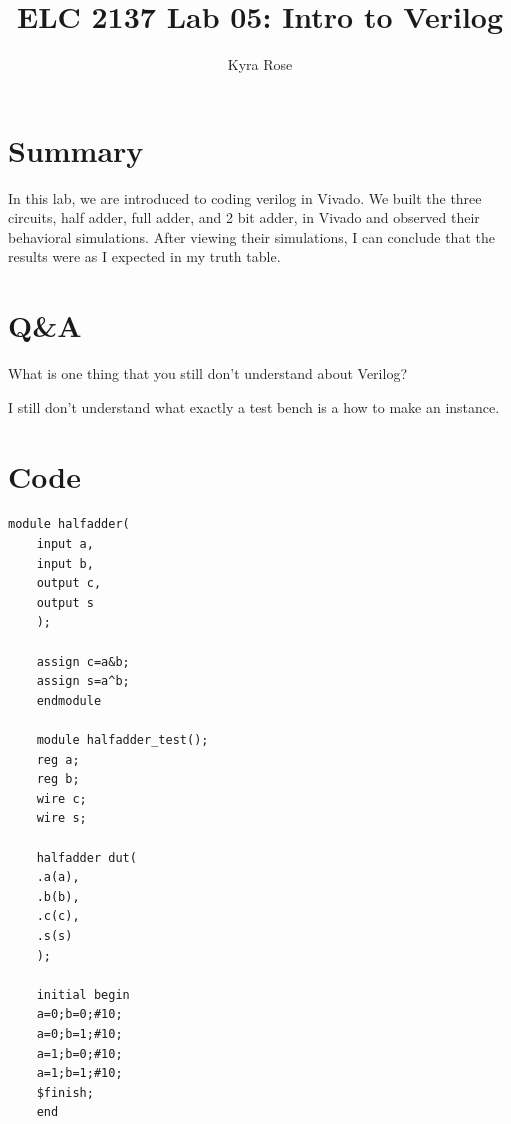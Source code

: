 \documentclass[11pt]{article}
\begin{document}
\title{ELC 2137 Lab 05: Intro to Verilog}
\author{Kyra Rose}

\maketitle


\section*{Summary}

In this lab, we are introduced to coding verilog in Vivado. We built the three circuits, half adder, full adder, and 2 bit adder, in Vivado and observed their behavioral simulations. After viewing their simulations, I can conclude that the results were as I expected in my truth table. 


\section*{Q\&A}

What is one thing that you still don't understand about Verilog?

I still don't understand what exactly a test bench is a how to make an instance. 

\section*{Code}

\begin{lstlisting}[style=Verilog,
	caption=Half Adder code,
	label=code:ex 
	]
	module halfadder(
	input a,
	input b,
	output c,
	output s
	);
	
	assign c=a&b;
	assign s=a^b;
	endmodule
	
	module halfadder_test();
	reg a;
	reg b;
	wire c;
	wire s;
	
	halfadder dut(
	.a(a),
	.b(b),
	.c(c),
	.s(s)
	);
	
	initial begin
	a=0;b=0;#10;
	a=0;b=1;#10;
	a=1;b=0;#10;
	a=1;b=1;#10;
	$finish;
	end 
\end{lstlisting}
\end{document}
